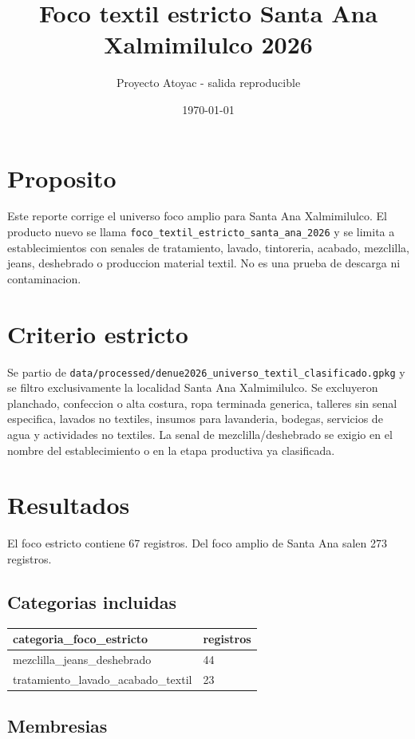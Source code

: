 \documentclass[11pt]{article}
\title{Foco textil estricto Santa Ana Xalmimilulco 2026}
\author{Proyecto Atoyac - salida reproducible}
\date{\today}
\begin{document}
\maketitle

\section{Proposito}

Este reporte corrige el universo foco amplio para Santa Ana Xalmimilulco. El producto nuevo se llama \texttt{foco\_textil\_estricto\_santa\_ana\_2026} y se limita a establecimientos con senales de tratamiento, lavado, tintoreria, acabado, mezclilla, jeans, deshebrado o produccion material textil. No es una prueba de descarga ni contaminacion.

\section{Criterio estricto}

Se partio de \texttt{data/processed/denue2026\_universo\_textil\_clasificado.gpkg} y se filtro exclusivamente la localidad Santa Ana Xalmimilulco. Se excluyeron planchado, confeccion o alta costura, ropa terminada generica, talleres sin senal especifica, lavados no textiles, insumos para lavanderia, bodegas, servicios de agua y actividades no textiles. La senal de mezclilla/deshebrado se exigio en el nombre del establecimiento o en la etapa productiva ya clasificada.

\section{Resultados}

El foco estricto contiene 67 registros. Del foco amplio de Santa Ana salen 273 registros.

\subsection{Categorias incluidas}

\begin{tabular}{ll}
\toprule
categoria\_foco\_estricto & registros \\
\midrule
mezclilla\_jeans\_deshebrado & 44 \\
tratamiento\_lavado\_acabado\_textil & 23 \\
\bottomrule
\end{tabular}

\subsection{Membresias}
\end{document}
